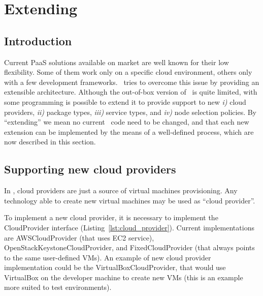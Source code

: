 
\chapter{Extending \ee}

\section{Introduction}

Current PaaS solutions available on market are well known for their low flexibility. Some of them work only on a specific cloud environment, others only with a few development frameworks. \ee\ tries to overcome this issue by providing an extensible architecture. Although the out-of-box version of \ee\ is quite limited, with some programming is possible to extend it to provide support to new \emph{i)} cloud providers, \emph{ii)} package types, \emph{iii)} service types, and \emph{iv)} node selection policies. By ``extending'' we mean no current \ee\ code need to be changed, and that each new extension can be implemented by the means of a well-defined process, which are now described in this section.

\section{Supporting new cloud providers}

In \ee, cloud providers are just a source of virtual machines provisioning. Any technology able to create new virtual machines may be used as ``cloud provider''. 

To implement a new cloud provider, it is necessary to implement the \textsf{CloudProvider} interface (Listing~\ref{lst:cloud_provider}). Current implementations are \textsf{AWSCloudProvider} (that uses EC2 service), \textsf{OpenStackKeystoneCloudProvider}, and \textsf{FixedCloudProvider} (that always points to the same user-defined VMs). An example of new cloud provider implementation could be the \textsf{VirtualBoxCloudProvider}, that would use VirtualBox on the developer machine to create new VMs (this is an example more suited to test environments).

\lstset{
language=Java,
numbers=left
}

